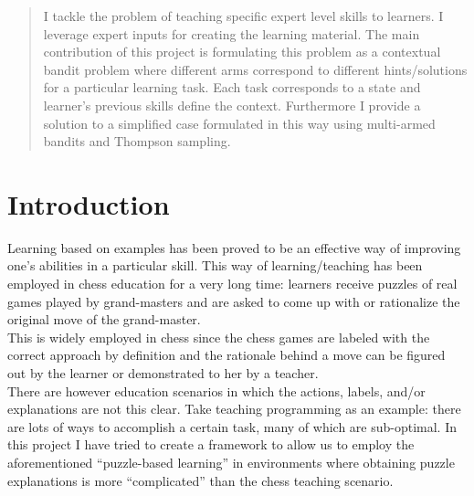 \documentclass[conference]{IEEEtran}
\begin{document}
	
	
	
	
	
	
	
	\maketitle
	
	\begin{abstract}
		I tackle the problem of teaching specific expert level skills to learners. I leverage expert inputs
		for creating the learning material. The main contribution of this project is formulating this problem
		as a contextual bandit problem where different arms correspond to different hints/solutions for a
		particular learning task. Each task corresponds to a state and learner's previous skills define the
		context. Furthermore I provide a solution to a simplified case formulated in this way using 
		multi-armed bandits and Thompson sampling.
	\end{abstract}

	
	\IEEEpeerreviewmaketitle
	

	
	\section{Introduction}
		Learning based on examples has been proved to be an effective way of improving one's abilities
	in a particular skill. This way of learning/teaching has been employed in chess education for a very long
	time: learners receive puzzles of real games played by grand-masters and are asked to come up
	with or rationalize the original move of the grand-master.\\
	This is widely employed in chess since the chess games are labeled with the correct approach by definition 
	and the rationale behind a move can be figured out by the learner or demonstrated to her by a teacher.\\
	There are however education scenarios in which the actions, labels, and/or explanations are not this clear.
	Take teaching programming as an example: there are lots of ways to accomplish a certain task, many of which
	are sub-optimal. In this project I have tried to create a framework to allow us to employ the aforementioned
	``puzzle-based learning'' in environments where obtaining puzzle explanations is more ``complicated'' than 
	the chess teaching scenario.
	
\end{document}
